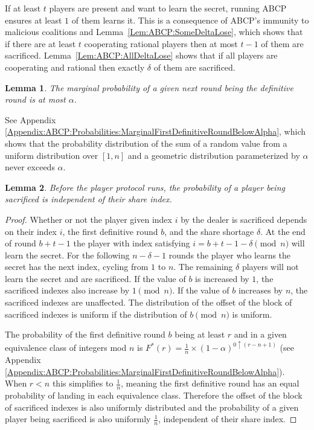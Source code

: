 \documentclass{dalcsthesis}
\newtheorem{lemma}{Lemma}
\begin{document}
If at least $t$ players are present and want to learn the secret, running ABCP ensures at least $1$ of them learns it. This is a consequence of ABCP's immunity to malicious coalitions and Lemma~\ref{Lem:ABCP:SomeDeltaLose}, which shows that if there are at least $t$ cooperating rational players then at most $t-1$ of them are sacrificed. Lemma~\ref{Lem:ABCP:AllDeltaLose} shows that if all players are cooperating and rational then exactly $\delta$ of them are sacrificed.

\begin{lemma}\label{Lem:ABPC:MarginalAtMostAlpha}The marginal probability of a given next round being the definitive round is at most $\alpha$.\end{lemma}
See Appendix \ref{Appendix:ABCP:Probabilities:MarginalFirstDefinitiveRoundBelowAlpha}, which shows that the probability distribution of the sum of a random value from a uniform distribution over $[1,n]$ and a geometric distribution parameterized by $\alpha$ never exceeds $\alpha$.

\begin{lemma}\label{Lem:ABCP:FairSacrificeBefore}Before the player protocol runs, the probability of a player being sacrificed is independent of their share index.\end{lemma}
\begin{proof}
Whether or not the player given index $i$ by the dealer is sacrificed depends on their index $i$, the first definitive round $b$, and the share shortage $\delta$. At the end of round $b+t-1$ the player with index satisfying $i = b+t-1-\delta \pmod{n}$ will learn the secret. For the following $n-\delta-1$ rounds the player who learns the secret has the next index, cycling from $1$ to $n$. The remaining $\delta$ players will not learn the secret and are sacrificed. If the value of $b$ is increased by $1$, the sacrificed indexes also increase by $1 \pmod{n}$. If the value of $b$ increases by $n$, the sacrificed indexes are unaffected. The distribution of the offset of the block of sacrificed indexes is uniform if the distribution of $b \pmod{n}$ is uniform.

The probability of the first definitive round $b$ being at least $r$ and in a given equivalence class of integers mod $n$ is $F^{*}(r) = \frac{1}{n} \times (1-\alpha)^{0 \uparrow (r - n + 1)}$ (see Appendix \ref{Appendix:ABCP:Probabilities:MarginalFirstDefinitiveRoundBelowAlpha}). When $r < n$ this simplifies to $\frac{1}{n}$, meaning the first definitive round has an equal probability of landing in each equivalence class. Therefore the offset of the block of sacrificed indexes is also uniformly distributed and the probability of a given player being sacrificed is also uniformly $\frac{1}{n}$, independent of their share index.
\end{proof}
\end{document}
